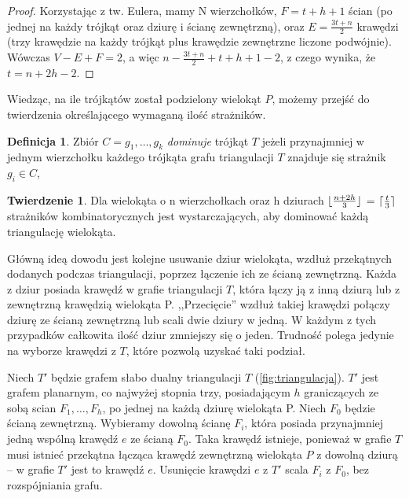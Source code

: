 \documentclass[brudnopis]{xmgr}
\DeclarePairedDelimiter\ceil{\lceil}{\rceil}
\DeclarePairedDelimiter\floor{\lfloor}{\rfloor}
\theoremstyle{definition}
\newtheorem{Twierdzenie}{Twierdzenie}
\newtheorem{Definicja}{Definicja}
\begin{document}
\begin{proof}
	Korzystając z tw. Eulera, mamy N wierzchołków, $F = t + h + 1$ ścian (po jednej na każdy trójkąt oraz dziurę i ścianę zewnętrzną), oraz $E = \frac{3t+n}{2}$ krawędzi (trzy krawędzie na każdy trójkąt plus krawędzie zewnętrzne liczone podwójnie).  Wówczas $V - E + F = 2$, a więc $n - \frac{3t+n}{2} + t + h + 1 - 2$, z czego wynika, że $t = n + 2h - 2$.
\end{proof}
Wiedząc, na ile trójkątów został podzielony wielokąt $P$, możemy przejść do twierdzenia określającego wymaganą ilość strażników.


\begin{Definicja} \cite{orourke}
  Zbiór $C = {g_1,\ldots,g_k}$ \emph{dominuje} trójkąt $T$ jeżeli przynajmniej w jednym  wierzchołku każdego trójkąta grafu triangulacji $T$ znajduje się strażnik $g_i \in C$,
\end{Definicja}

\begin{Twierdzenie} \cite{orourke}
  Dla wielokąta o n wierzchołkach oraz h dziurach $\floor{\frac{n+2h}{3}}$ = $\ceil{\frac{t}{3}}$ strażników kombinatorycznych jest wystarczających, aby dominować każdą triangulację wielokąta.
\end{Twierdzenie}

\indent Główną ideą dowodu jest kolejne usuwanie dziur wielokąta, wzdłuż przekątnych dodanych podczas triangulacji, poprzez łączenie ich ze ścianą zewnętrzną. Każda z dziur posiada krawędź w grafie triangulacji $T$, która łączy ją z inną dziurą lub z zewnętrzną krawędzią wielokąta P. ,,Przecięcie'' wzdłuż takiej krawędzi połączy dziurę ze ścianą zewnętrzną lub scali dwie dziury w jedną. W każdym z tych przypadków całkowita ilość dziur zmniejszy się o jeden. Trudność polega jedynie na wyborze krawędzi z $T$, które pozwolą uzyskać taki podział.

\indent Niech $T'$ będzie grafem słabo dualny triangulacji $T$ (\ref{fig:triangulacja}). $T'$ jest grafem planarnym, co najwyżej stopnia trzy, posiadającym $h$ graniczących ze sobą scian $F_1, \ldots, F_h$, po jednej na każdą dziurę wielokąta P. Niech $F_0$ będzie ścianą zewnętrzną. Wybieramy dowolną ścianę $F_i$, która posiada przynajmniej jedną wspólną krawędź $e$ ze ścianą $F_0$. Taka krawędź istnieje, ponieważ w grafie $T$ musi istnieć przekątna łącząca krawędź zewnętrzną wielokąta $P$ z dowolną dziurą -- w grafie $T'$ jest to krawędź $e$. Usunięcie krawędzi $e$ z $T'$ scala $F_i$ z $F_0$, bez rozspójniania grafu.
\end{document}
